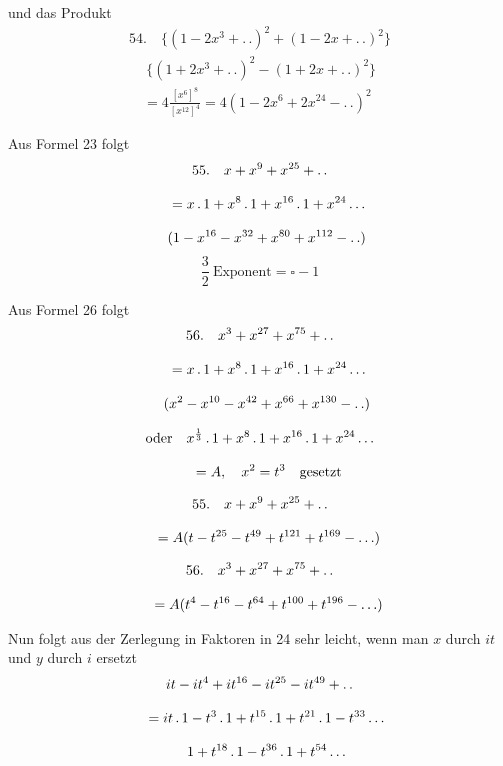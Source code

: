 und das Produkt
\[
\begin{gathered}
54.\quad{}
\{(1-2x^3+ .\,. )^2+(1-2x+ .\,. )^2\}\\[8pt]\quad{}\ \{(1+2x^3+ .\,. )^2-(1+2x+ .\,. )^2\}\\[8pt]
\quad=4\frac{[x^6]^8}{[x^{12}]^4}=4(1-2x^6+2x^{24}- .\,. )^2
\end{gathered}
\]


Aus Formel 23 folgt
\[
\begin{gathered}55.\quad{}
x+x^9+x^{25}+ .\,. \\[8pt]\quad{}=x\,.\,1+x^8\,.\,1+x^{16}\,.\,1+x^{24}\mathinner{.\,.\,.}\\[8pt]\quad{}(1-x^{16}-x^{32}+x^{80}+x^{112}- .\,. )\end{gathered}
\]
\[
\frac32\ \text{Exponent}=\square-1
\]


Aus Formel 26 folgt
\[
\begin{gathered}56.\quad{}
x^3+x^{27}+x^{75}+ .\,. \\[8pt]\quad{}=x\,.\,1+x^8\,.\,1+x^{16}\,.\,1+x^{24}\mathinner{.\,.\,.}\\[8pt]\quad{}(x^2-x^{10}-x^{42}+x^{66}+x^{130}- .\,. )\end{gathered}
\]

\[
\begin{gathered}\text{oder}\quad x^{\frac13}\,.\,1+x^8\,.\,1+x^{16}\,.\,1+x^{24}\mathinner{.\,.\,.}\\[8pt]\quad{}=A,\quad x^2=t^3\quad\text{gesetzt}\end{gathered}
\]

\[
\begin{gathered}55.\quad{}
x+x^9+x^{25}+ .\,. \\[8pt]\quad{}=A(t-t^{25}-t^{49}+t^{121}+t^{169}-\mathinner{.\,.\,.})\end{gathered}
\]

\[
\begin{gathered}56.\quad{}
x^3+x^{27}+x^{75}+ .\,. \\[8pt]\quad{}=A(t^4-t^{16}-t^{64}+t^{100}+t^{196}-\mathinner{.\,.\,.})\end{gathered}
\]


Nun folgt aus der Zerlegung in Faktoren in 24 sehr leicht, wenn man \(x\) durch \(it\)
und \(y\) durch \(i\) ersetzt
\[
\begin{gathered}
it-it^4+it^{16}-it^{25}-it^{49}+ .\,.\\[8pt]
\quad=it\,.\,1-t^3\,.\,1+t^{15}\,.\,1+t^{21}\,.\,1-t^{33}\mathinner{.\,.\,.}\\[8pt]\quad{}1+t^{18}\,.\,1-t^{36}\,.\,1+t^{54}\mathinner{.\,.\,.}
\end{gathered}
\]



